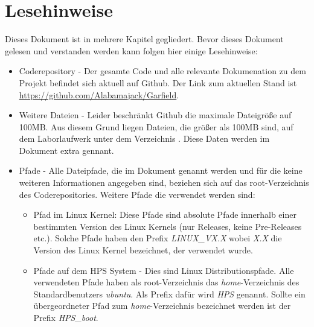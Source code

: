 \section{Lesehinweise}
Dieses Dokument ist in mehrere Kapitel gegliedert. Bevor dieses Dokument gelesen und verstanden werden kann folgen hier einige Lesehinweise:
\begin{itemize}
	\item Coderepository - Der gesamte Code und alle relevante Dokumenation zu dem Projekt befindet sich aktuell auf Github. Der Link zum aktuellen Stand ist \href{https://github.com/Alabamajack/Garfield}{https://github.com/Alabamajack/Garfield}. 
	\item Weitere Dateien - Leider beschränkt Github die maximale Dateigröße auf 100MB. Aus diesem Grund liegen Dateien, die größer als 100MB sind, auf dem Laborlaufwerk unter dem Verzeichnis . Diese Daten werden im Dokument extra gennant.
	\item Pfade - Alle Dateipfade, die im Dokument genannt werden und für die keine weiteren Informationen angegeben sind, beziehen sich auf das root-Verzeichnis des Coderepositories. Weitere Pfade die verwendet werden sind:
	\begin{itemize}
		\item Pfad im Linux Kernel: Diese Pfade sind absolute Pfade innerhalb einer bestimmten Version des Linux Kernels (nur Releases, keine Pre-Releases etc.). Solche Pfade haben den Prefix \textit{LINUX\_VX.X} wobei \textit{X.X} die Version des Linux Kernel bezeichnet, der verwendet wurde.
		\item Pfade auf dem \ac{HPS} System - Dies sind Linux Distributionspfade. Alle verwendeten Pfade haben als root-Verzeichnis das \textit{home}-Verzeichnis des Standardbenutzers \textit{ubuntu}. Als Prefix dafür wird \textit{HPS} genannt. Sollte ein übergeordneter Pfad zum \textit{home}-Verzeichnis bezeichnet werden ist der Prefix \textit{HPS\_boot}.
	\end{itemize}
\end{itemize}